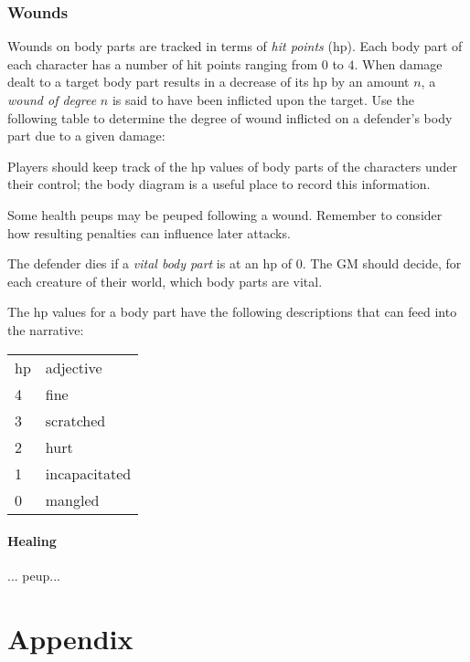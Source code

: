 \documentclass[12pt]{article}
\newcommand{\notes}[1]{{\color{Tan} #1}}
\newcommand{\emdex}[1]{\emph{#1}\index{#1}}
\begin{document}
\subsubsection{Wounds}\label{sec:wounds}

Wounds on body parts are tracked in terms of \emdex{hit points} (hp).
Each body part of each character has a number of hit points ranging from
$0$ to $4$.
When damage dealt to a target body part results in a decrease of its hp by an amount $n$, 
a \emph{wound of degree}
$n$ is said to have been inflicted upon the target.
Use the following table to determine the degree of wound inflicted on a defender's body part
due to a given damage:
\begin{center}

\end{center}
Players should keep track of the hp values of body parts of the characters under their control;
the body diagram is a useful place to record this information.

Some health \notes{peups may be peuped} following a wound.
Remember to consider how resulting penalties can influence later attacks.

The defender dies if a \emdex{vital body part} is at an hp of $0$.
The GM should decide, for each creature of their world, which body parts are vital.

The hp values for a body part have the following descriptions that can feed into the narrative:
\begin{center}
{\setlength{\extrarowheight}{1pt}
\begin{tabular}{l|l}
hp & adjective \\
\cline{1-2}
4  & fine \\
3  & scratched \\
2  & hurt \\
1  & incapacitated \\
0  & mangled
\end{tabular}}
\end{center}

\paragraph{Healing} ...\notes{peup}...


\section{Appendix}
\end{document}
